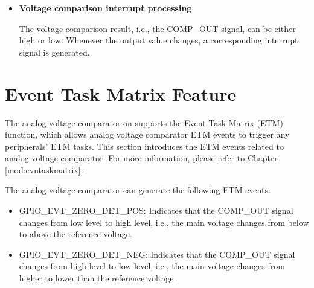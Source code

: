 \documentclass[main\_\_EN.tex]{subfiles}
\begin{document}
\begin{itemize}
          The internal reference voltage range is 0 \verb+~+ (0.7 × VDDPST1) V with a step of 0.1 × VDDPST1 V, where VDDPST1 is the supply voltage of the analog voltage comparator which is equal to the power supply voltage of the chip (usually 3.3 V). The internal reference voltage value can be configured through \hyperref[fielddesc:GPIOEXTDREFCOMP0]{GPIO\_EXT\_DREF\_COMP\_0}.

          The external reference voltage is accessed directly from the pad with an input range of 0 \verb+~+ (0.7 × VDDPST1) V, same as the internal reference voltage, requiring no additional configuration.

    \item {\bfseries Voltage comparison interrupt processing}

          The voltage comparison result, i.e., the COMP\_OUT signal, can be either high or low. Whenever the output value changes, a corresponding interrupt signal is generated.

\end{itemize}



\section{Event Task Matrix Feature}
\label{sec:anacom-etm-func}

The analog voltage comparator on \chipname{} supports the Event Task Matrix (ETM) function, which allows analog voltage comparator ETM events to trigger any peripherals' ETM tasks. This section introduces the ETM events related to analog voltage comparator. For more information, please refer to Chapter \ref{mod:evntaskmatrix} .

The analog voltage comparator can generate the following ETM events:

\begin{itemize}
    \item GPIO\_EVT\_ZERO\_DET\_POS: Indicates that the COMP\_OUT signal changes from low level to high level, i.e., the main voltage changes from below to above the reference voltage.
    \item GPIO\_EVT\_ZERO\_DET\_NEG: Indicates that the COMP\_OUT signal changes from high level to low level, i.e., the main voltage changes from higher to lower than the reference voltage.
\end{itemize}
\end{document}
